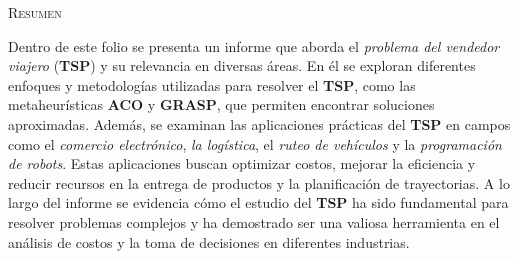 \begin{flushleft}
    {\scshape\Huge Resumen \par}
\end{flushleft}
    Dentro de este folio se presenta un informe que aborda el \textit{problema del vendedor viajero} (\textbf{TSP}) y su relevancia en diversas áreas. En él se exploran diferentes enfoques y metodologías utilizadas para resolver el \textbf{TSP}, como las metaheurísticas \textbf{ACO} y \textbf{GRASP}, que permiten encontrar soluciones aproximadas. Además, se examinan las aplicaciones prácticas del \textbf{TSP} en campos como el \textit{comercio electrónico}, \textit{la logística}, el \textit{ruteo de vehículos} y la \textit{programación de robots}. Estas aplicaciones buscan optimizar costos, mejorar la eficiencia y reducir recursos en la entrega de productos y la planificación de trayectorias. A lo largo del informe se evidencia cómo el estudio del \textbf{TSP} ha sido fundamental para resolver problemas complejos y ha demostrado ser una valiosa herramienta en el análisis de costos y la toma de decisiones en diferentes industrias.
    